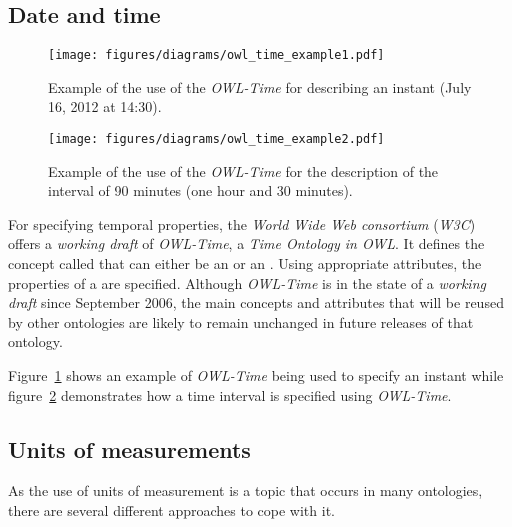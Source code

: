 \subsection{Date and time}
\label{subsec:date_ontologies}


\begin{figure}
\centering
\texttt{[image: figures/diagrams/owl\_time\_example1.pdf]}
\caption{Example of the use of the \emph{OWL-Time} for describing an instant (July 16, 2012 at 14:30).}
\label{fig:owl_time_example1}
\end{figure}

\begin{figure}
\centering
\texttt{[image: figures/diagrams/owl\_time\_example2.pdf]}
\caption{Example of the use of the \emph{OWL-Time} for the description of the interval of 90 minutes (one hour and 30 minutes).}
\label{fig:owl_time_example2}
\end{figure}

For specifying temporal properties, the \emph{World Wide Web consortium} (\emph{W3C}) offers a \emph{working draft} of \emph{OWL-Time}\cite{owl-time}, a \emph{Time Ontology in OWL}. It defines the concept called  that can either be an  or an . Using appropriate attributes, the properties of a  are specified. Although \emph{OWL-Time} is in the state of a \emph{working draft} since September 2006, the main concepts and attributes that will be reused by other ontologies are likely to remain unchanged in future releases of that ontology.

Figure~\ref{fig:owl_time_example1} shows an example of \emph{OWL-Time} being used to specify an instant while figure~\ref{fig:owl_time_example2} demonstrates how a time interval is specified using \emph{OWL-Time}.

\subsection{Units of measurements}
\label{subsec:unit_ontologies}

As the use of units of measurement is a topic that occurs in many ontologies, there are several different approaches to cope with it.

